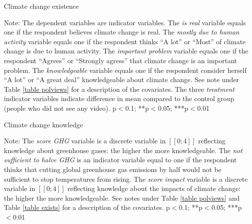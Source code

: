 \documentclass{article}
\begin{document}
\begin{table}[h!]
	\caption{Climate change existence} \label{table exists}
	\begin{center}
		\scalebox{0.7}{}
	\end{center}
	{\footnotesize Note: The dependent variables are indicator variables. The \textit{is real} variable equals one if the respondent believes climate change is real. The \textit{mostly due to human activity} variable equals one if the respondent thinks ``A lot'' or ``Most'' of climate change is due to human activity. The \textit{important problem} variable equals one if the respondent ``Agrees'' or ``Strongly agress'' that climate change is an important problem. The \textit{knowledgeable} variable equals one if the respondent consider herself ``A lot'' or ``A great deal'' knowledgeable about climate change. See note under Table \ref{table polviews} for a description of the covariates. The three \textit{treatment} indicator variables indicate difference in mean compared to the control group (people who did not see any video).
	\newline *p$<$0.1; **p$<$0.05; ***p$<$0.01}
\end{table}		

\begin{table}[h!]
	\caption{Climate change knowledge}
	\begin{center}
		\scalebox{0.7}{}
	\end{center}
	{\footnotesize Note: The \textit{score GHG} variable is a discrete variable in $[\![ 0;4 ]\!]$ reflecting knowledge about greenhouse gases: the higher the more knowledgeable. The \textit{not sufficient to halve GHG} is an indicator variable equal to one if the respondent thinks that cutting global greenhouse gas emissions by half would not be sufficient to stop temperatures from rising. The \textit{score impact} variable is a discrete variable in $[\![ 0;4 ]\!]$ reflecting knowledge about the impacts of climate change: the higher the more knowledgeable. See notes under Table \ref{table polviews} and Table \ref{table exists} for a description of the covariates.
	\newline *p$<$0.1; **p$<$0.05; ***p$<$0.01}
\end{table}
\end{document}
